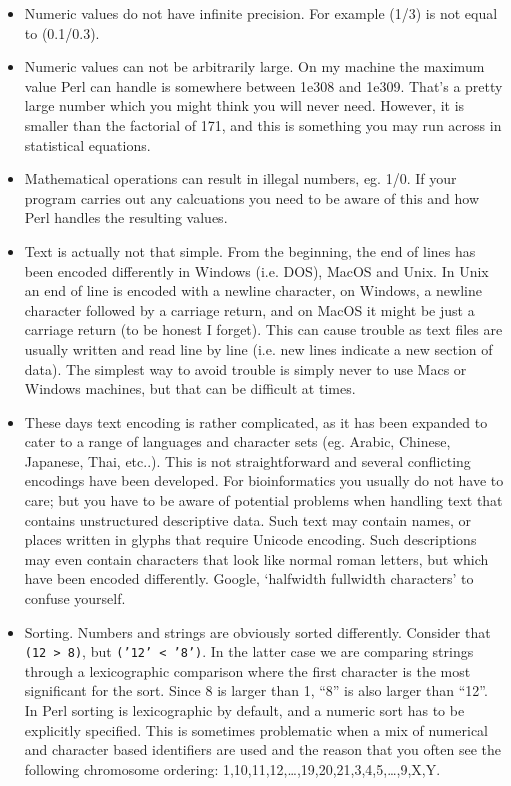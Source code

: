 \documentclass[11pt]{article}
\begin{document}
\begin{itemize}
\item Numeric values do not have infinite precision. For example (1/3) is
  not equal to (0.1/0.3).
\item Numeric values can not be arbitrarily large. On my machine the
  maximum value Perl can handle is somewhere between 1e308 and
  1e309. That's a pretty large number which you might think 
  you will never need.  However, it is smaller than the factorial of
  171, and this is something you may run across in statistical
  equations.
\item Mathematical operations can result in illegal numbers, eg. 1/0. If
  your program carries out any calcuations you need to be aware of
  this and how Perl handles the resulting values.
\item Text is actually not that simple. From the beginning, the end of
  lines has been encoded differently in Windows (i.e. DOS), MacOS and
  Unix. In Unix an end of line is encoded with a newline character, on
  Windows, a newline character followed by a carriage return, and on
  MacOS it might be just a carriage return (to be honest I
  forget). This can cause trouble as text files are usually written
  and read line by line (i.e.  new lines indicate a new section of
  data). The simplest way to avoid trouble is simply never to use
  Macs or Windows machines, but that can be difficult at times.
\item These days text encoding is rather complicated, as it has been
  expanded to cater to a range of languages and character sets
  (eg. Arabic, Chinese, Japanese, Thai, etc..). This is not
  straightforward and several conflicting encodings have been
  developed. For bioinformatics you usually do not have to care; but
  you have to be aware of potential problems when handling text that
  contains unstructured descriptive data. Such text may contain
  names, or places written in glyphs that require Unicode
  encoding. Such descriptions may even contain characters that look
  like normal roman letters, but which have been encoded differently.
  Google, `halfwidth fullwidth characters' to confuse yourself.
\item Sorting. Numbers and strings are obviously sorted
  differently. Consider that \texttt{(12 > 8)}, but \texttt{('12' < '8')}. In the latter
  case we are comparing strings through a lexicographic comparison
  where the first character is the most significant for the
  sort. Since 8 is larger than 1, ``8'' is also larger than ``12''. In
  Perl sorting is lexicographic by default, and a numeric sort has to
  be explicitly specified. This is sometimes problematic when a mix of
  numerical and character based identifiers are used and the reason
  that you often see the following chromosome ordering:
  1,10,11,12,\ldots{},19,20,21,3,4,5,\ldots{},9,X,Y.
\end{itemize}
\end{document}
